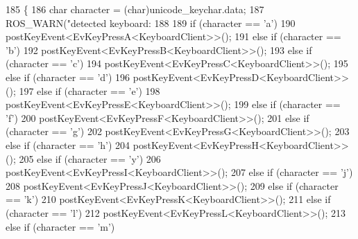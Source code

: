 \begin{DoxyCode}
185         \{
186                 \textcolor{keywordtype}{char} character = (char)unicode\_keychar.data;
187                 ROS\_WARN(\textcolor{stringliteral}{"detected keyboard: %
188 
189                 \textcolor{keywordflow}{if} (character == \textcolor{charliteral}{'a'})
190                         postKeyEvent<EvKeyPressA<KeyboardClient>>();
191                 \textcolor{keywordflow}{else} \textcolor{keywordflow}{if} (character == \textcolor{charliteral}{'b'})
192                         postKeyEvent<EvKeyPressB<KeyboardClient>>();
193                 \textcolor{keywordflow}{else} \textcolor{keywordflow}{if} (character == \textcolor{charliteral}{'c'})
194                         postKeyEvent<EvKeyPressC<KeyboardClient>>();
195                 \textcolor{keywordflow}{else} \textcolor{keywordflow}{if} (character == \textcolor{charliteral}{'d'})
196                         postKeyEvent<EvKeyPressD<KeyboardClient>>();
197                 \textcolor{keywordflow}{else} \textcolor{keywordflow}{if} (character == \textcolor{charliteral}{'e'})
198                         postKeyEvent<EvKeyPressE<KeyboardClient>>();
199                 \textcolor{keywordflow}{else} \textcolor{keywordflow}{if} (character == \textcolor{charliteral}{'f'})
200                         postKeyEvent<EvKeyPressF<KeyboardClient>>();
201                 \textcolor{keywordflow}{else} \textcolor{keywordflow}{if} (character == \textcolor{charliteral}{'g'})
202                         postKeyEvent<EvKeyPressG<KeyboardClient>>();
203                 \textcolor{keywordflow}{else} \textcolor{keywordflow}{if} (character == \textcolor{charliteral}{'h'})
204                         postKeyEvent<EvKeyPressH<KeyboardClient>>();
205                 \textcolor{keywordflow}{else} \textcolor{keywordflow}{if} (character == \textcolor{charliteral}{'y'})
206                         postKeyEvent<EvKeyPressI<KeyboardClient>>();
207                 \textcolor{keywordflow}{else} \textcolor{keywordflow}{if} (character == \textcolor{charliteral}{'j'})
208                         postKeyEvent<EvKeyPressJ<KeyboardClient>>();
209                 \textcolor{keywordflow}{else} \textcolor{keywordflow}{if} (character == \textcolor{charliteral}{'k'})
210                         postKeyEvent<EvKeyPressK<KeyboardClient>>();
211                 \textcolor{keywordflow}{else} \textcolor{keywordflow}{if} (character == \textcolor{charliteral}{'l'})
212                         postKeyEvent<EvKeyPressL<KeyboardClient>>();
213                 \textcolor{keywordflow}{else} \textcolor{keywordflow}{if} (character == \textcolor{charliteral}{'m'})
}
\end{DoxyCode}

